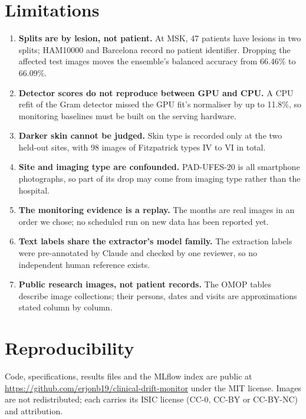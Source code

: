 \documentclass[11pt]{article}
\begin{document}
\section{Limitations}
\begin{enumerate}
\item \textbf{Splits are by lesion, not patient.} At MSK, 47 patients have lesions in two
splits; HAM10000 and Barcelona record no patient identifier. Dropping the affected test images
moves the ensemble's balanced accuracy from 66.46\% to 66.09\%.
\item \textbf{Detector scores do not reproduce between GPU and CPU.} A CPU refit of the Gram
detector missed the GPU fit's normaliser by up to 11.8\%, so monitoring baselines must be built
on the serving hardware.
\item \textbf{Darker skin cannot be judged.} Skin type is recorded only at the two held-out
sites, with 98 images of Fitzpatrick types IV to VI in total.
\item \textbf{Site and imaging type are confounded.} PAD-UFES-20 is all smartphone photographs,
so part of its drop may come from imaging type rather than the hospital.
\item \textbf{The monitoring evidence is a replay.} The months are real images in an order we
chose; no scheduled run on new data has been reported yet.
\item \textbf{Text labels share the extractor's model family.} The extraction labels were
pre-annotated by Claude and checked by one reviewer, so no independent human reference exists.
\item \textbf{Public research images, not patient records.} The OMOP tables describe image
collections; their persons, dates and visits are approximations stated column by column.
\end{enumerate}

\section{Reproducibility}
Code, specifications, results files and the MLflow index are public at
\url{https://github.com/erjonb19/clinical-drift-monitor} under the MIT license. Images are
not redistributed; each carries its ISIC license (CC-0, CC-BY or CC-BY-NC) and attribution.
\end{document}
